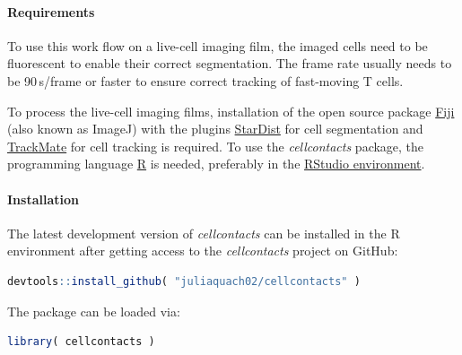 \documentclass{report}
\begin{document}
\begin{figure}
\end{figure}

\paragraph{Requirements}
To use this work flow on a live-cell imaging film, the imaged cells need to be fluorescent to enable their correct segmentation. The frame rate usually needs to be 90\,s/frame or faster to ensure correct tracking of fast-moving T cells.

To process the live-cell imaging films, installation of the open source package \href{https://imagej.net/software/fiji/}{Fiji} (also known as ImageJ) with the plugins \href{https://imagej.net/plugins/stardist}{StarDist} for cell segmentation and \href{https://imagej.net/plugins/trackmate/}{TrackMate} for cell tracking is required.
To use the \textit{cellcontacts} package, the programming language \href{https://cran.r-project.org/bin/windows/base/}{R} is needed, preferably in the \href{https://posit.co/download/rstudio-desktop/}{RStudio environment}.

\paragraph{Installation}
The latest development version of \textit{cellcontacts} can be installed in the R environment after getting access to the \textit{cellcontacts} project on GitHub:
\begin{lstlisting}[language=R]
	devtools::install_github( "juliaquach02/cellcontacts" ) 
\end{lstlisting}
The package can be loaded via:
\begin{lstlisting}[language=R]
	library( cellcontacts )
\end{lstlisting}
\end{document}
